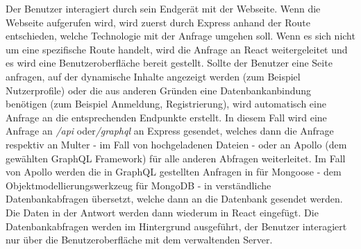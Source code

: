 Der Benutzer interagiert durch sein Endgerät mit der Webseite. Wenn die Webseite aufgerufen wird, wird zuerst durch Express anhand der Route entschieden, welche Technologie mit der Anfrage umgehen soll. Wenn es sich nicht um eine spezifische Route handelt, wird die Anfrage an React weitergeleitet und es wird eine Benutzeroberfläche bereit gestellt. Sollte der Benutzer eine Seite anfragen, auf der dynamische Inhalte angezeigt werden (zum Beispiel Nutzerprofile) oder die aus anderen Gründen eine Datenbankanbindung benötigen (zum Beispiel Anmeldung, Registrierung), wird automatisch eine Anfrage an die entsprechenden Endpunkte erstellt. In diesem Fall wird eine Anfrage an \textit{/api} oder\textit{/graphql} an Express gesendet, welches dann die Anfrage respektiv an Multer - im Fall von hochgeladenen Dateien - oder an Apollo (dem gewählten GraphQL Framework) für alle anderen Abfragen weiterleitet. Im Fall von Apollo werden die in GraphQL gestellten Anfragen in für Mongoose - dem Objektmodellierungswerkzeug für MongoDB - in verständliche Datenbankabfragen übersetzt, welche dann an die Datenbank gesendet werden. Die Daten in der Antwort werden dann wiederum in React eingefügt. Die Datenbankabfragen werden im Hintergrund ausgeführt, der Benutzer interagiert nur über die Benutzeroberfläche mit dem verwaltenden Server.